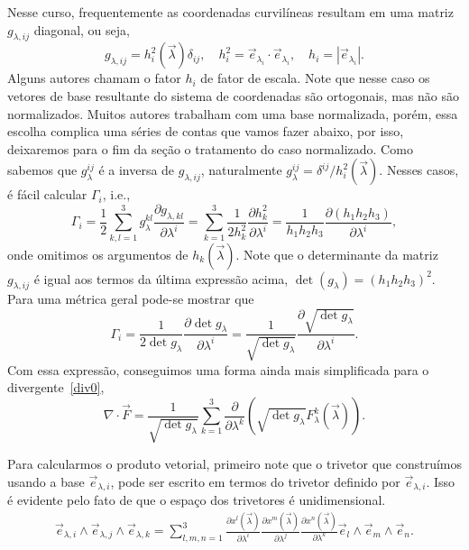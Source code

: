 Nesse curso, frequentemente as coordenadas curvilíneas resultam em uma matriz
$g_{\lambda,ij}$ diagonal, ou seja,
\begin{equation}\label{gdiag}
	g_{\lambda,ij} = h_i^2(\vec{\lambda})\delta_{ij},\quad h^2_i = \vec{e}_{\lambda_i} \cdot
	\vec{e}_{\lambda_i}, \quad h_i = \left\vert\vec{e}_{\lambda_i}\right\vert .
\end{equation}
Alguns autores chamam o fator $h_i$ de fator de escala. Note que nesse caso os
vetores de base resultante do sistema de coordenadas são ortogonais, mas não são
normalizados. Muitos autores trabalham com uma base normalizada, porém, essa
escolha complica uma séries de contas que vamos fazer abaixo, por isso,
deixaremos para o fim da seção o tratamento do caso normalizado. Como sabemos
que $g_\lambda^{ij}$ é a inversa de $g_{\lambda,ij}$, naturalmente
$g_\lambda^{ij} = \delta^{ij}/h_i^2(\vec{\lambda})$. Nesses casos, é fácil
calcular $\Gamma_i$, i.e.,
\begin{equation}
	\Gamma_i = \frac{1}{2} \sum_{k,l=1}^3g_\lambda^{kl}\frac{\partial g_{\lambda,kl}}{\partial\lambda^i} =  \sum_{k=1}^3\frac{1}{2h_k^2}\frac{\partial h_{k}^2}{\partial\lambda^i} = \frac{1}{h_{1}h_{2}h_{3}}\frac{\partial \left(h_{1}h_{2}h_{3}\right)}{\partial\lambda^i},
\end{equation}
onde omitimos os argumentos de $h_k(\vec{\lambda})$. Note que o determinante da
matriz $g_{\lambda,ij}$ é igual aos termos da última expressão acima,
$\det(g_\lambda) = \left(h_1h_2h_3\right)^2$. Para uma métrica geral pode-se
mostrar que
\begin{equation}
	\Gamma_i = \frac{1}{2\det g_\lambda}\frac{\partial \det g_\lambda}{\partial\lambda^i} = \frac{1}{\sqrt{\det g_\lambda}}\frac{\partial \sqrt{\det g_\lambda}}{\partial\lambda^i}.
\end{equation}
Com essa expressão, conseguimos uma forma ainda mais simplificada para o
divergente~\eqref{div0},
\begin{equation}
	\nabla\cdot\vec{F} = \frac{1}{\sqrt{\det g_\lambda}}\sum_{k=1}^3\frac{\partial }{\partial \lambda^k}\left(\sqrt{\det g_\lambda}F_\lambda^k(\vec{\lambda})\right).
\end{equation}

Para calcularmos o produto vetorial, primeiro note que o trivetor que
construímos usando a base $\vec{e}_{\lambda,i}$, pode ser escrito em termos do
trivetor definido por $\vec{e}_{\lambda,i}$.  Isso é evidente pelo fato de que o
espaço dos trivetores é unidimensional.
\begin{align}
	\nonumber \vec{e}_{\lambda,i}\wedge\vec{e}_{\lambda,j}\wedge\vec{e}_{\lambda,k} = \sum_{l,m,n=1}^3\frac{\partial x^l(\vec{\lambda})}{\partial \lambda^i}\frac{\partial x^m(\vec{\lambda})}{\partial \lambda^j}\frac{\partial x^n(\vec{\lambda})}{\partial \lambda^k}\vec{e}_l\wedge\vec{e}_m\wedge\vec{e}_n.
\end{align}


